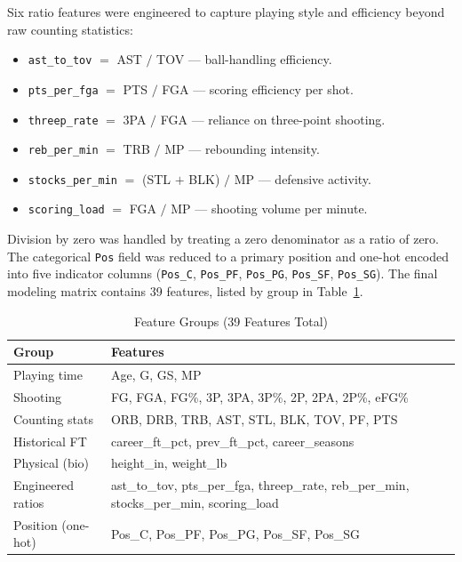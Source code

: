 \documentclass[conference]{IEEEtran}
\begin{document}
Six ratio features were engineered to capture playing style and efficiency beyond raw counting statistics:

\begin{itemize}
\item \texttt{ast\_to\_tov} $=$ AST $/$ TOV --- ball-handling efficiency.
\item \texttt{pts\_per\_fga} $=$ PTS $/$ FGA --- scoring efficiency per shot.
\item \texttt{threep\_rate} $=$ 3PA $/$ FGA --- reliance on three-point shooting.
\item \texttt{reb\_per\_min} $=$ TRB $/$ MP --- rebounding intensity.
\item \texttt{stocks\_per\_min} $=$ (STL $+$ BLK) $/$ MP --- defensive activity.
\item \texttt{scoring\_load} $=$ FGA $/$ MP --- shooting volume per minute.
\end{itemize}

Division by zero was handled by treating a zero denominator as a ratio of zero. The categorical \texttt{Pos} field was reduced to a primary position and one-hot encoded into five indicator columns (\texttt{Pos\_C}, \texttt{Pos\_PF}, \texttt{Pos\_PG}, \texttt{Pos\_SF}, \texttt{Pos\_SG}). The final modeling matrix contains 39 features, listed by group in Table~\ref{tab:features}.

\begin{table}[H]
\centering
\caption{Feature Groups (39 Features Total)}
\begin{tabular}{|l|p{5.2cm}|}
\hline
\textbf{Group} & \textbf{Features} \\
\hline
Playing time & Age, G, GS, MP \\
\hline
Shooting & FG, FGA, FG\%, 3P, 3PA, 3P\%, 2P, 2PA, 2P\%, eFG\% \\
\hline
Counting stats & ORB, DRB, TRB, AST, STL, BLK, TOV, PF, PTS \\
\hline
Historical FT & career\_ft\_pct, prev\_ft\_pct, career\_seasons \\
\hline
Physical (bio) & height\_in, weight\_lb \\
\hline
Engineered ratios & ast\_to\_tov, pts\_per\_fga, threep\_rate, reb\_per\_min, stocks\_per\_min, scoring\_load \\
\hline
Position (one-hot) & Pos\_C, Pos\_PF, Pos\_PG, Pos\_SF, Pos\_SG \\
\hline
\end{tabular}
\label{tab:features}
\end{table}
\end{document}

